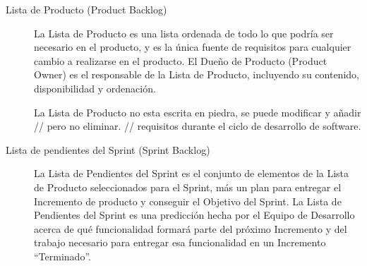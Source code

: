         \begin{description}
          \item[Lista de Producto (Product Backlog)]

          La Lista de Producto es una lista ordenada de todo lo que podría ser necesario en el producto, y es la única fuente de requisitos para cualquier cambio a realizarse en el producto. El Dueño de Producto (Product Owner) es el responsable de la Lista de Producto, incluyendo su contenido, disponibilidad y ordenación.

          La Lista de Producto no esta escrita en piedra, se puede modificar y a\~nadir  // pero  no eliminar.  // requisitos durante el ciclo de desarrollo de software.

          \item[Lista de pendientes del Sprint (Sprint Backlog)]

          La Lista de Pendientes del Sprint es el conjunto de elementos de la Lista de Producto seleccionados para el Sprint, más un plan para entregar el Incremento de producto y conseguir el Objetivo del Sprint. La Lista de Pendientes del Sprint es una predicción hecha por el Equipo de Desarrollo acerca de qué funcionalidad formará parte del próximo Incremento y del trabajo necesario para entregar esa funcionalidad en un Incremento “Terminado”.

        \end{description}

